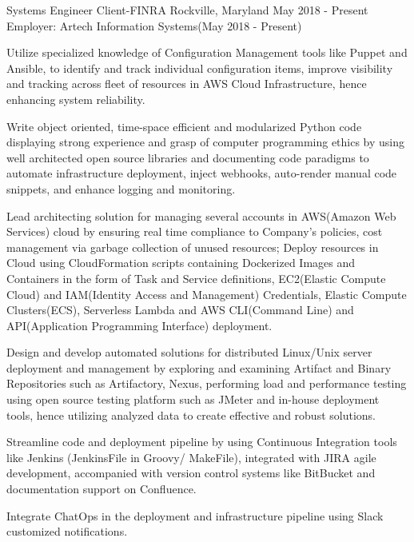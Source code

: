 

\begin{cventries}

  \cventryemp
    {Systems Engineer} %
    {Client-FINRA} %
    {Rockville, Maryland} %
    {May 2018 - Present} %
    {Employer: Artech Information Systems(May 2018 - Present)}
    {
      \begin{cvitems} %
        \item {Utilize specialized knowledge of Configuration Management tools like Puppet and Ansible, to identify and track individual configuration items, improve visibility and tracking across fleet of resources in AWS Cloud Infrastructure, hence enhancing system reliability.}
        \item {Write object oriented, time-space efficient and modularized Python code displaying strong experience and grasp of computer programming ethics by using well architected open source libraries and documenting code paradigms to automate infrastructure deployment, inject webhooks, auto-render manual code snippets, and enhance logging and monitoring.}
        \item {Lead architecting solution for managing several accounts in AWS(Amazon Web Services) cloud by ensuring real time compliance to Company’s policies, cost management via garbage collection of unused resources; Deploy resources in Cloud using CloudFormation scripts containing Dockerized Images and Containers in the form of Task and Service definitions, EC2(Elastic Compute Cloud) and IAM(Identity Access and Management) Credentials, Elastic Compute Clusters(ECS), Serverless Lambda and AWS CLI(Command Line) and API(Application Programming Interface) deployment.}
        \item {Design and develop automated solutions for distributed Linux/Unix server deployment and management by exploring and examining Artifact and Binary Repositories such as Artifactory, Nexus, performing load and performance testing using open source testing platform such as JMeter and in-house deployment tools, hence utilizing analyzed data to create effective and robust solutions.}
        \item {Streamline code and deployment pipeline by using Continuous Integration tools like Jenkins (JenkinsFile in Groovy/ MakeFile), integrated with JIRA agile development, accompanied with version control systems like BitBucket and documentation support on Confluence.}
        \item {Integrate ChatOps in the deployment and infrastructure pipeline using Slack customized notifications.}
      \end{cvitems}
    }


\end{cventries}
